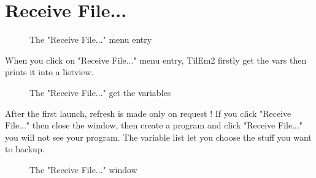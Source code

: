 \documentclass[10pt]{report}
\begin{document}
\section{Receive File...}
\begin{figure}[H]
\centering
{}
\caption{The "Receive File..." menu entry}
\end{figure}
When you click on "Receive File..." menu entry, TilEm2 firstly get the vars then prints it into a listview.\newline
\begin{figure}[H]
\centering
{}
\caption{The "Receive File..." get the variables}
\end{figure}
After the first launch, refresh is made only on request !\newline
If you click "Receive File..." then close the window, then create a program and click "Receive File..." you will not see your program.\newline
The variable list let you choose the stuff you want to backup.\newline
\begin{figure}[H]
\centering
{}
\caption{The "Receive File..." window}
\end{figure}
\end{document}
